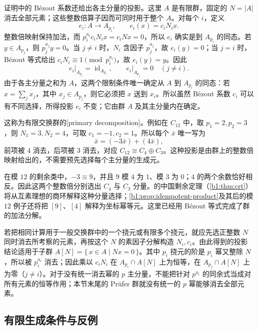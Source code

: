 证明中的 Bézout 系数还给出各主分量的投影。这里 \(A\) 是有限群，固定的 \(N=|A|\) 消去全部元素；这些整数倍算子因而可同时用于整个 \(A\)。对每个 \(i\)，定义
\[
	e_i:A\longrightarrow A_{p_i},\qquad e_i(x)=c_iN_i x.
\]
整数倍映射保持加法，而 \(p_i^{a_i}c_iN_i x=c_iNx=0\)，所以 \(e_i\) 确实是到 \(A_{p_i}\) 的同态。若 \(y\in A_{p_j}\)，则 \(p_j^{a_j}y=0\)。当 \(j\neq i\) 时，\(N_i\) 含因子 \(p_j^{a_j}\)，故 \(e_i(y)=0\)；当 \(j=i\) 时，Bézout 等式给出 \(c_iN_i\equiv1\pmod{p_i^{a_i}}\)，故 \(e_i(y)=y\)。因此
\[
	e_i\big|_{A_{p_i}}=\operatorname{id}_{A_{p_i}}, \qquad e_i\big|_{A_{p_j}}=0\quad(j\neq i).
\]
由于各主分量之和为 \(A\)，这两个限制条件唯一确定从 \(A\) 到 \(A_{p_i}\) 的同态：若 \(x=\sum_jx_j\)，其中 \(x_j\in A_{p_j}\)，则它必须把 \(x\) 送到 \(x_i\)。所以虽然 Bézout 系数 \(c_i\) 可以有不同选择，所得投影 \(e_i\) 不变；它由群 \(A\) 及其主分量内在确定。

\ProseParagraphBreak
这称为有限交换群的[primary decomposition]。例如在 \(C_{12}\) 中，取 \(p_1=2,p_2=3\)，则 \(N_1=3,N_2=4\)，可取 \(c_1=-1,c_2=1\)。所以每个 \(\bar x\) 唯一写为
\[
	\bar x=(-3\bar x)+(4\bar x),
\]
前项被 \(4\) 消去，后项被 \(3\) 消去，对应 \(C_{12}\cong C_4\oplus C_3\)。这种投影是由群上的整数倍映射给出的，不需要预先选择每个主分量的生成元。

\ProseParagraphBreak
在模 \(12\) 的剩余类中，\(-3\equiv9\)，并且 \(9\) 模 \(4\) 为 \(1\)、模 \(3\) 为 \(0\)；\(4\) 的两个余数恰好相反。因此这两个整数倍分别选出 \(C_4\) 与 \(C_3\) 分量。的中国剩余定理（\cref{b1:thm:crt}）将从互素理想的商环解释这种分量选择；\cref{b1:prop:idempotent-product}及其后的模 \(12\) 例子还将把 \([9]\)、\([4]\) 解释为坐标幂等元。这里已经用 Bézout 等式完成了群的加法分解。

\ProseParagraphBreak
若把相同计算用于一般交换群中的一个挠元或有限多个挠元，就应先选正整数 \(N\) 同时消去所考察的元素，再按这个 \(N\) 的素因子分解构造 \(N_i,c_i\)。由此得到的投影结论适用于子群 \(A[N]=\{\,x\in A\mid Nx=0\,\}\)。其中 \(p_i\) 挠元的阶是 \(p_i\) 幂又整除 \(N\)，所以被 \(p_i^{a_i}\) 消去；因此乘以 \(c_iN_i\) 在 \(A_{p_i}\cap A[N]\) 上为恒等，在 \(A_{p_j}\cap A[N]\) 上为零（\(j\ne i\)）。对于没有统一消去幂的 \(p\) 主分量，不能把针对 \(p^{a_i}\) 的同余式当成对所有元素的恒等作用；本节末尾的 Prüfer 群就没有统一的 \(p\) 幂能够消去全部元素。

\subsection{有限生成条件与反例}
\label{b1:subsec:0902:03}

